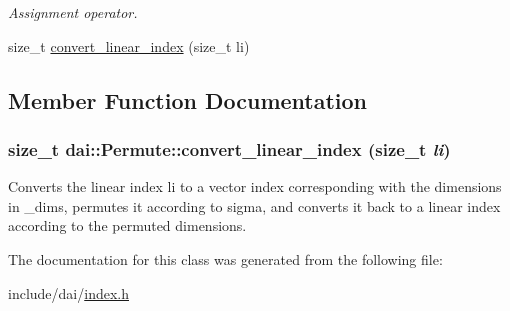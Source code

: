 \begin{CompactItemize}
\begin{CompactList}\small\item\em Assignment operator. \item\end{CompactList}\item 
size\_\-t \hyperlink{classdai_1_1Permute_19b7ca5bdbac54ba1a812ab52e6f11aa}{convert\_\-linear\_\-index} (size\_\-t li)
\end{CompactItemize}


\subsection{Member Function Documentation}
\hypertarget{classdai_1_1Permute_19b7ca5bdbac54ba1a812ab52e6f11aa}{
\subsubsection[convert\_\-linear\_\-index]{\setlength{\rightskip}{0pt plus 5cm}size\_\-t dai::Permute::convert\_\-linear\_\-index (size\_\-t {\em li})}}
\label{classdai_1_1Permute_19b7ca5bdbac54ba1a812ab52e6f11aa}


Converts the linear index li to a vector index corresponding with the dimensions in \_\-dims, permutes it according to sigma, and converts it back to a linear index according to the permuted dimensions. 

The documentation for this class was generated from the following file:\begin{CompactItemize}
\item 
include/dai/\hyperlink{index_8h}{index.h}\end{CompactItemize}
